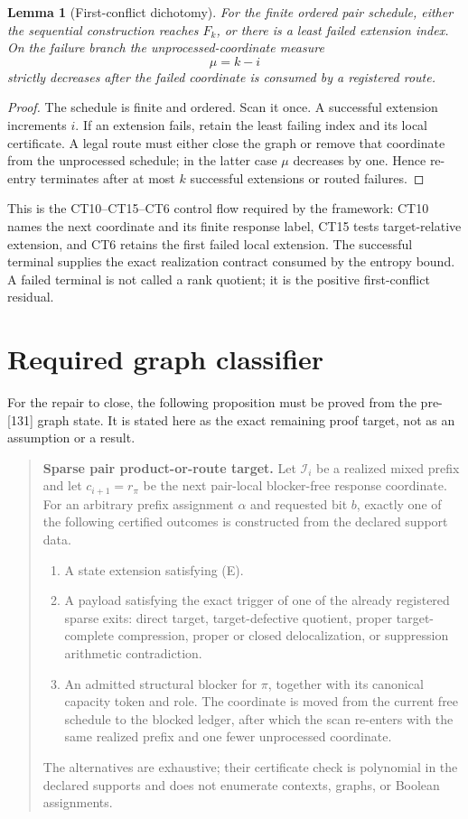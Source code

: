 \documentclass[11pt]{article}
\newtheorem{lemma}{Lemma}
\newcommand{\Coords}{\mathcal I}
\begin{document}
\begin{lemma}[First-conflict dichotomy]
For the finite ordered pair schedule, either the sequential construction
reaches $F_k$, or there is a least failed extension index.  On the failure
branch the unprocessed-coordinate measure
\[
\mu=k-i
\]
strictly decreases after the failed coordinate is consumed by a registered
route.
\end{lemma}

\begin{proof}
The schedule is finite and ordered.  Scan it once.  A successful extension
increments $i$.  If an extension fails, retain the least failing index and its
local certificate.  A legal route must either close the graph or remove that
coordinate from the unprocessed schedule; in the latter case $\mu$ decreases
by one.  Hence re-entry terminates after at most $k$ successful extensions or
routed failures.
\end{proof}

This is the CT10--CT15--CT6 control flow required by the framework: CT10 names
the next coordinate and its finite response label, CT15 tests target-relative
extension, and CT6 retains the first failed local extension.  The successful
terminal supplies the exact realization contract consumed by the entropy
bound.  A failed terminal is not called a rank quotient; it is the positive
first-conflict residual.

\section{Required graph classifier}

For the repair to close, the following proposition must be proved from the
pre-[131] graph state.  It is stated here as the exact remaining proof target,
not as an assumption or a result.

\begin{quote}
\textbf{Sparse pair product-or-route target.}
Let $\Coords_i$ be a realized mixed prefix and let
$c_{i+1}=r_\pi$ be the next pair-local blocker-free response coordinate.
For an arbitrary prefix assignment $\alpha$ and requested bit $b$, exactly
one of the following certified outcomes is constructed from the declared
support data.
\begin{enumerate}
\item A state extension satisfying (E).
\item A payload satisfying the exact trigger of one of the already registered
sparse exits: direct target, target-defective quotient, proper
target-complete compression, proper or closed delocalization, or suppression
arithmetic contradiction.
\item An admitted structural blocker for $\pi$, together with its canonical
capacity token and role.  The coordinate is moved from the current free
schedule to the blocked ledger, after which the scan re-enters with the same
realized prefix and one fewer unprocessed coordinate.
\end{enumerate}
The alternatives are exhaustive; their certificate check is polynomial in
the declared supports and does not enumerate contexts, graphs, or Boolean
assignments.
\end{quote}
\end{document}
